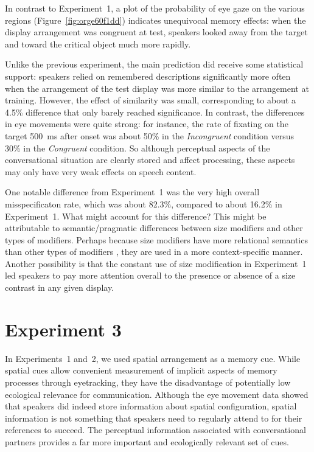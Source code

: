 \documentclass[natbib,man,a4paper]{apa6}
\begin{document}
In contrast to Experiment~1, a plot of the probability of eye gaze on the various regions (Figure~\ref{fig:orge60f1dd}) indicates unequivocal memory effects: when the display arrangement was congruent at test, speakers looked away from the target and toward the critical object much more rapidly.

Unlike the previous experiment, the main prediction did receive some statistical support: speakers relied on remembered descriptions significantly more often when the arrangement of the test display was more similar to the arrangement at training.  However, the effect of similarity was small, corresponding to about a 
4.5\%
difference that only barely reached significance. In contrast, the differences in eye movements were quite strong: for instance, the rate of fixating on the target 500~ms after onset was about 50\% in the \emph{Incongruent} condition versus 30\% in the \emph{Congruent} condition. So although perceptual aspects of the conversational situation are clearly stored and affect processing, these aspects may only have very weak effects on speech content.

One notable difference from Experiment~1 was the very high overall misspecificaton rate, which was about 
82.3\%, compared to about 
16.2\% 
in Experiment~1.  What might account for this difference?  This might be attributable to semantic/pragmatic differences between size modifiers and other types of modifiers. Perhaps because size modifiers have more relational semantics than other types of modifiers \citep{GrodnerSedivy2011}, they are used in a more context-specific manner. Another possibility is that the constant use of size modification in Experiment~1 led speakers to pay more attention overall to the presence or absence of a size contrast in any given display.

\section*{Experiment 3}
\label{sec:org4c03956}

In Experiments~1 and~2, we used spatial arrangement as a memory cue. While spatial cues allow convenient measurement of implicit aspects of memory processes through eyetracking, they have the disadvantage of potentially low ecological relevance for communication. Although the eye movement data showed that speakers did indeed store information about spatial configuration, spatial information is not something that speakers need to regularly attend to for their references to succeed. The perceptual information associated with conversational partners provides a far more important and ecologically relevant set of cues.
\end{document}
